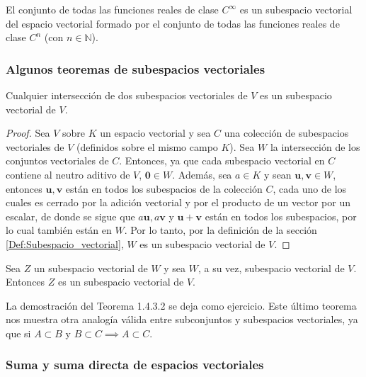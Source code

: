\documentclass[12pt]{article}
\newenvironment{teorema}[2][Teorema]{\begin{trivlist}
\item[\hskip \labelsep {\bfseries #1}\hskip \labelsep {\bfseries #2.}]}{\end{trivlist}}
\begin{document}
\vspace{3mm}

El conjunto de todas las funciones reales de clase $C^{\infty}$ es un subespacio vectorial del espacio vectorial formado por el conjunto de todas las funciones reales de clase $C^n$ (con $n\in\mathbb{N}$).

\vspace{3mm}

\subsubsection{Algunos teoremas de subespacios vectoriales} \label{Teo:Subespacios_vectoriales}

\begin{teorema} {1.4.3.1} Cualquier intersección de dos subespacios vectoriales de $V$ es un subespacio vectorial de $V$.

\begin{proof}
    Sea $V$ sobre $K$ un espacio vectorial y sea $C$ una colección de subespacios vectoriales de $V$ (definidos sobre el mismo campo $K$). Sea $W$ la intersección de los conjuntos vectoriales de $C$. Entonces, ya que cada subespacio vectorial en $C$ contiene al neutro aditivo de $V$, $\mathbf{0}\in W$. Además, sea $a\in K$ y sean $\mathbf{u},\mathbf{v}\in W$, entonces $\mathbf{u},\mathbf{v}$ están en todos los subespacios de la colección $C$, cada uno de los cuales es cerrado por la adición vectorial y por el producto de un vector por un escalar, de donde se sigue que $a\mathbf{u}, a\mathbf{v}$ y $\mathbf{u}+\mathbf{v}$ están en todos los subespacios, por lo cual también están en $W$. Por lo tanto, por la definición de la sección \ref{Def:Subespacio_vectorial}, $W$ es un subespacio vectorial de $V$.
\end{proof}
\end{teorema}

\begin{teorema} {1.4.3.2} Sea $Z$ un subespacio vectorial de $W$ y sea $W$, a su vez, subespacio vectorial de $V$. Entonces $Z$ es un subespacio vectorial de $V$.
\end{teorema}

\noindent La demostración del Teorema 1.4.3.2 se deja como ejercicio. Este último teorema nos muestra otra analogía válida entre subconjuntos y subespacios vectoriales, ya que si $A \subset B$ y $B\subset C \implies A\subset C$.

\subsubsection{Suma y suma directa de espacios vectoriales}
\end{document}
